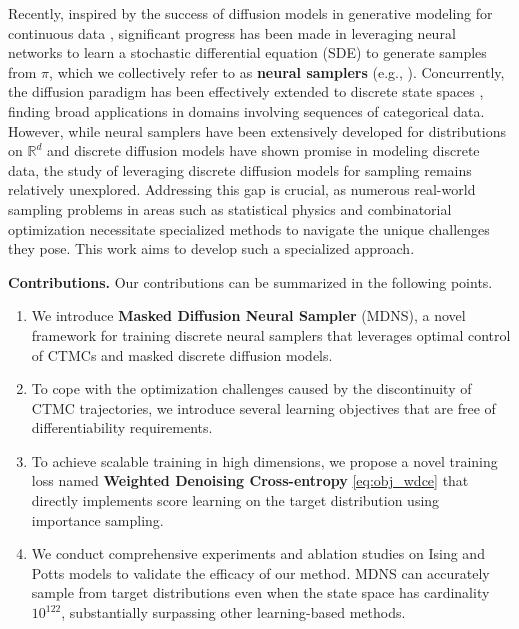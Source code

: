 \documentclass{article}
\theoremstyle{remark}
\newcommand{\R}{\mathbb{R}}
\begin{document}
Recently, inspired by the success of diffusion models in generative modeling for continuous data \cite{ho2020denoising,song2021denoising,song2021scorebased}, significant progress has been made in leveraging neural networks to learn a stochastic differential equation (SDE) to generate samples from $\pi$, which we collectively refer to as \textbf{neural samplers} (e.g., \cite{zhang2022path,vargas2023denoising,albergo2025nets,havens2025adjoint}). Concurrently, the diffusion paradigm has been effectively extended to discrete state spaces \cite{austin2021structured,campbell2022continuous,sun2023score,lou2024discrete}, finding broad applications in domains involving sequences of categorical data. However, while neural samplers have been extensively developed for distributions on $\R^d$ and discrete diffusion models have shown promise in modeling discrete data, the study of leveraging discrete diffusion models for sampling remains relatively unexplored. Addressing this gap is crucial, as numerous real-world sampling problems in areas such as statistical physics \cite{faulkner2024sampling} and combinatorial optimization \cite{sun2023revisiting,sanokowski2024a,sanokowski2025scalable} necessitate specialized methods to navigate the unique challenges they pose. This work aims to develop such a specialized approach.

\textbf{Contributions.} Our contributions can be summarized in the following points.
\begin{enumerate}[leftmargin=15pt]
    \item We introduce \textbf{Masked Diffusion Neural Sampler} (MDNS), a novel framework for training discrete neural samplers that leverages optimal control of CTMCs and masked discrete diffusion models.
    \item To cope with the optimization challenges caused by the discontinuity of CTMC trajectories, we introduce several learning objectives that are free of differentiability requirements.
    \item To achieve scalable training in high dimensions, we propose a novel training loss named \textbf{Weighted Denoising Cross-entropy} \cref{eq:obj_wdce} that directly implements score learning on the target distribution using importance sampling.
    \item We conduct comprehensive experiments and ablation studies on Ising and Potts models to validate the efficacy of our method. MDNS can accurately sample from target distributions even when the state space has cardinality $10^{122}$, substantially surpassing other learning-based methods.
\end{enumerate}
\end{document}

